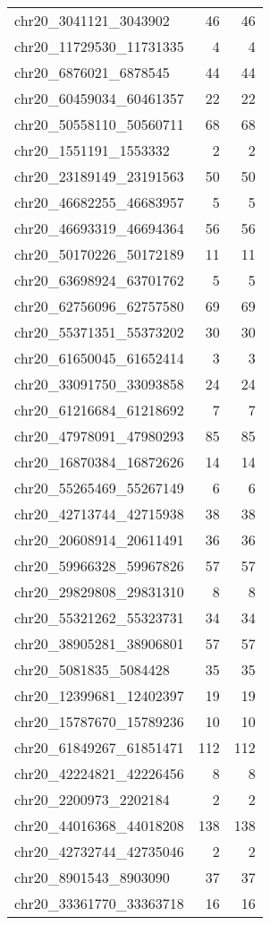 \begin{longtable}{lrr}
chr20_3041121_3043902 & 46 & 46 \\
chr20_11729530_11731335 & 4 & 4 \\
chr20_6876021_6878545 & 44 & 44 \\
chr20_60459034_60461357 & 22 & 22 \\
chr20_50558110_50560711 & 68 & 68 \\
chr20_1551191_1553332 & 2 & 2 \\
chr20_23189149_23191563 & 50 & 50 \\
chr20_46682255_46683957 & 5 & 5 \\
chr20_46693319_46694364 & 56 & 56 \\
chr20_50170226_50172189 & 11 & 11 \\
chr20_63698924_63701762 & 5 & 5 \\
chr20_62756096_62757580 & 69 & 69 \\
chr20_55371351_55373202 & 30 & 30 \\
chr20_61650045_61652414 & 3 & 3 \\
chr20_33091750_33093858 & 24 & 24 \\
chr20_61216684_61218692 & 7 & 7 \\
chr20_47978091_47980293 & 85 & 85 \\
chr20_16870384_16872626 & 14 & 14 \\
chr20_55265469_55267149 & 6 & 6 \\
chr20_42713744_42715938 & 38 & 38 \\
chr20_20608914_20611491 & 36 & 36 \\
chr20_59966328_59967826 & 57 & 57 \\
chr20_29829808_29831310 & 8 & 8 \\
chr20_55321262_55323731 & 34 & 34 \\
chr20_38905281_38906801 & 57 & 57 \\
chr20_5081835_5084428 & 35 & 35 \\
chr20_12399681_12402397 & 19 & 19 \\
chr20_15787670_15789236 & 10 & 10 \\
chr20_61849267_61851471 & 112 & 112 \\
chr20_42224821_42226456 & 8 & 8 \\
chr20_2200973_2202184 & 2 & 2 \\
chr20_44016368_44018208 & 138 & 138 \\
chr20_42732744_42735046 & 2 & 2 \\
chr20_8901543_8903090 & 37 & 37 \\
chr20_33361770_33363718 & 16 & 16 \\

\end{longtable}
